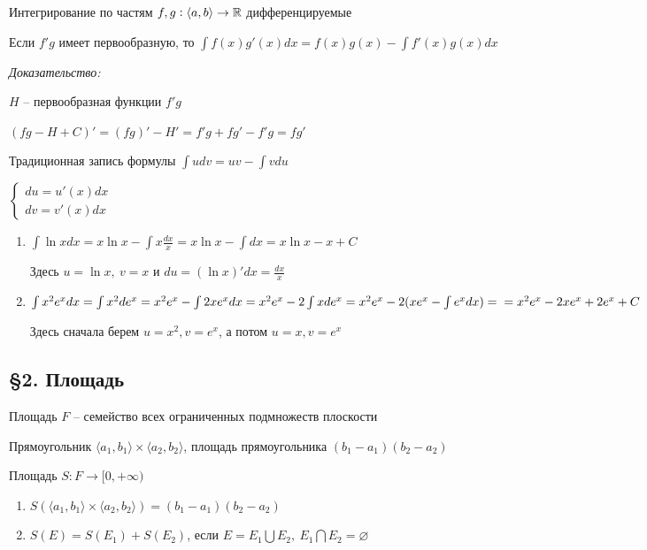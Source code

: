 \documentclass[12pt]{article}
\newcommand{\q}[1]{\langle #1 \rangle}
\begin{document}
\begin{theo}{Интегрирование по частям}
    $f, g : \q{a, b} \rightarrow \R$ дифференцируемые

    Если $f'g$ имеет первообразную, то $\int f(x)g'(x)dx = f(x)g(x) - \int f'(x)g(x)dx$
\end{theo}

\textit{Доказательство:}

$H$ -- первообразная функции $f'g$

$(fg - H + C)' = (fg)' - H' = f'g + fg' - f'g = fg'$

\begin{nota}{Традиционная запись формулы}
    $\int udv = uv - \int vdu$

    $\begin{cases}
        du = u'(x)dx \\
        dv = v'(x)dx
    \end{cases}$
\end{nota}

\begin{Example}{}
    \begin{enumerate}
        \item $\int \ln{x}dx = x\ln{x} - \int x \frac{dx}{x} = x\ln{x} - \int dx = x\ln{x} - x + C$
        
        Здесь $u = \ln{x},\ v = x$ и $du = (\ln{x})'dx = \frac{dx}{x}$ 

        \item $\int x^2 e^x dx = \int x^2 de^x = x^2 e^x - \int 2x e^x dx = x^2 e^x - 2\int xde^x = x^2e^x - 2(xe^x - \int e^xdx) = \\ = x^2e^x - 2xe^x + 2e^x + C$
        
        Здесь сначала берем $u = x^2, v = e^x$, а потом $u = x, v = e^x$
    \end{enumerate}
\end{Example}

\subsection*{\S 2. Площадь}

\begin{defin}{Площадь}
    $F$ -- семейство всех ограниченных подмножеств плоскости

    Прямоугольник $\q{a_1, b_1} \times \q{a_2, b_2}$, площадь прямоугольника $(b_1 - a_1)(b_2 - a_2)$

    Площадь $S : F \rightarrow [0, + \infty)$

    \begin{enumerate}
        \item $S(\q{a_1, b_1} \times \q{a_2, b_2}) = (b_1 - a_1)(b_2 - a_2)$
        \item $S(E) = S(E_1) + S(E_2)$, если $E = E_1 \bigcup E_2,\ E_1 \bigcap E_2 = \varnothing$
    \end{enumerate}
\end{defin}
\end{document}
